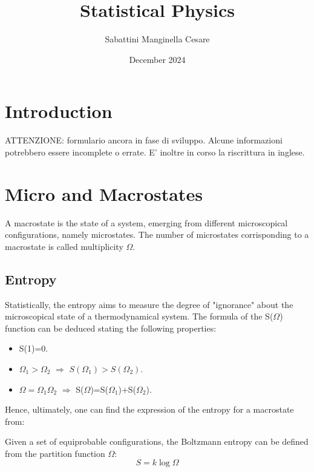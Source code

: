 \documentclass{article}
\title{Statistical Physics}
\author{Sabattini Manginella Cesare}
\date{December 2024}
\begin{document}
\maketitle

\tableofcontents

\newpage

\section{Introduction}
ATTENZIONE: formulario ancora in fase di sviluppo. Alcune informazioni potrebbero essere incomplete o errate.
E' inoltre in corso la riscrittura in inglese.

\newpage

\section{Micro and Macrostates}
A macrostate is the state of a system, emerging from different microscopical configurations, namely microstates.
The number of microstates corrisponding to a macrostate is called multiplicity $\Omega$.

\subsection{Entropy}
Statistically, the entropy aims to measure the degree of "ignorance" about the microscopical state of a thermodynamical system.
The formula of the S($\Omega$) function can be deduced stating the following properties:

\begin{itemize}
    \item S(1)=0.
    \item $\Omega_1>\Omega_2$ $\Longrightarrow$ $S(\Omega_1)>S(\Omega_2)$.
    \item $\Omega=\Omega_1\Omega_2$ $\Longrightarrow$ S($\Omega$)=S($\Omega_1$)+S($\Omega_2$).
\end{itemize}

Hence, ultimately, one can find the expression of the entropy for a macrostate from:

\begin{tcolorbox}[colframe=gray!50, colback=gray!10, coltitle=black, title=Boltzmann Entropy]
    Given a set of equiprobable configurations, the Boltzmann entropy can be defined from the partition function $\Omega$:
    \begin{equation}
        S = k \log \Omega
    \end{equation}
\end{tcolorbox}
\end{document}
